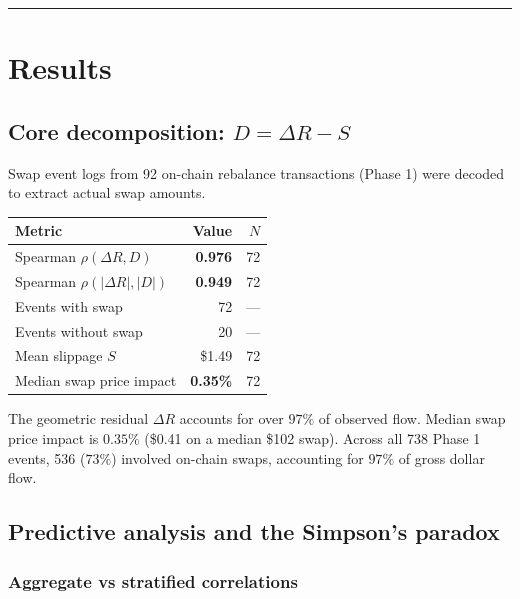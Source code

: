 \documentclass[11pt,a4paper]{article}
\begin{document}
\begin{center}\rule{0.5\linewidth}{0.5pt}\end{center}

\section{Results}\label{sec:results}

\subsection{Core decomposition: \texorpdfstring{$D = \Delta R - S$}{D = Delta R - S}}\label{sec:decomposition}

Swap event logs from 92 on-chain rebalance transactions (Phase 1) were decoded to extract actual swap amounts.

\begin{table}[H]
\centering
\begin{tabular}{@{}lrr@{}}
\toprule
Metric & Value & $N$ \\
\midrule
Spearman $\rho(\Delta R, D)$                 & \textbf{0.976} & 72 \\
Spearman $\rho(|\Delta R|, |D|)$             & \textbf{0.949} & 72 \\
Events with swap                              & 72             & --- \\
Events without swap                           & 20             & --- \\
Mean slippage $S$                             & \$1.49         & 72 \\
Median swap price impact                      & \textbf{0.35\%} & 72 \\
\bottomrule
\end{tabular}
\end{table}

The geometric residual $\Delta R$ accounts for over $97\%$ of observed flow. Median swap price impact is $0.35\%$ (\$0.41 on a median \$102 swap). Across all 738 Phase 1 events, 536 ($73\%$) involved on-chain swaps, accounting for $97\%$ of gross dollar flow.

\subsection{Predictive analysis and the Simpson's paradox}\label{sec:predictive}

\subsubsection*{Aggregate vs stratified correlations}
\end{document}
